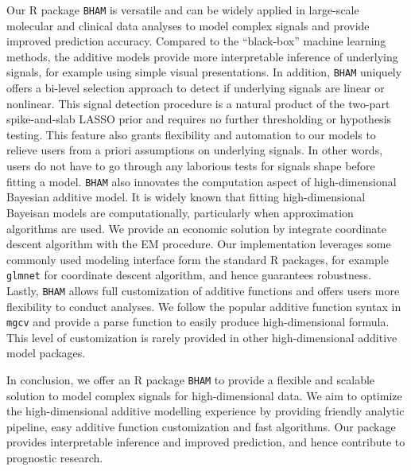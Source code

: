 \documentclass[
]{jss}
\begin{document}
Our R package \texttt{BHAM} is versatile and can be widely applied in
large-scale molecular and clinical data analyses to model complex
signals and provide improved prediction accuracy. Compared to the
``black-box'' machine learning methods, the additive models provide more
interpretable inference of underlying signals, for example using simple
visual presentations. In addition, \texttt{BHAM} uniquely offers a
bi-level selection approach to detect if underlying signals are linear
or nonlinear. This signal detection procedure is a natural product of
the two-part spike-and-slab LASSO prior and requires no further
thresholding or hypothesis testing. This feature also grants flexibility
and automation to our models to relieve users from a priori assumptions
on underlying signals. In other words, users do not have to go through
any laborious tests for signals shape before fitting a model.
\texttt{BHAM} also innovates the computation aspect of high-dimensional
Bayesian additive model. It is widely known that fitting
high-dimensional Bayeisan models are computationally, particularly when
approximation algorithms are used. We provide an economic solution by
integrate coordinate descent algorithm with the EM procedure. Our
implementation leverages some commonly used modeling interface form the
standard R packages, for example \texttt{glmnet} for coordinate descent
algorithm, and hence guarantees robustness. Lastly, \texttt{BHAM} allows
full customization of additive functions and offers users more
flexibility to conduct analyses. We follow the popular additive function
syntax in \texttt{mgcv} and provide a parse function to easily produce
high-dimensional formula. This level of customization is rarely provided
in other high-dimensional additive model packages.

In conclusion, we offer an R package \texttt{BHAM} to provide a flexible
and scalable solution to model complex signals for high-dimensional
data. We aim to optimize the high-dimensional additive modelling
experience by providing friendly analytic pipeline, easy additive
function customization and fast algorithms. Our package provides
interpretable inference and improved prediction, and hence contribute to
prognostic research.

\clearpage


\end{document}
